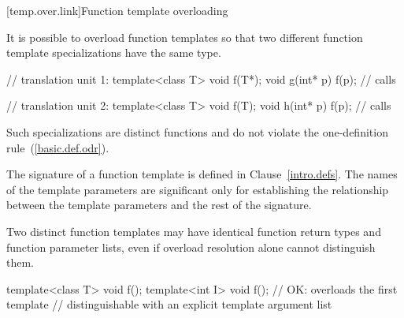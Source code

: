 [temp.over.link]{Function template overloading}

\pnum
{}%
It is possible to overload function templates so that two different
function template specializations have the same type.
\begin{example}

\begin{minipage}{.45\hsize}
\begin{codeblock}
// translation unit 1:
template<class T>
  void f(T*);
void g(int* p) {
  f(p); // calls 
}
\end{codeblock}
\end{minipage}
\begin{minipage}{.45\hsize}
\begin{codeblock}
// translation unit 2:
template<class T>
  void f(T);
void h(int* p) {
  f(p); // calls 
}
\end{codeblock}
\end{minipage}

\end{example}

\pnum
Such specializations are distinct functions and do not violate the one-definition
rule~(\ref{basic.def.odr}).

\pnum
The signature of a function template
is defined in Clause~\ref{intro.defs}.
The names of the template parameters are significant only for establishing
the relationship between the template parameters and the rest of the
signature.
\begin{note}
Two distinct function templates may have identical function return types and
function parameter lists, even if overload resolution alone cannot distinguish
them.

\begin{codeblock}
template<class T> void f();
template<int I> void f();       // OK: overloads the first template
                                // distinguishable with an explicit template argument list
\end{codeblock}
\end{note}

